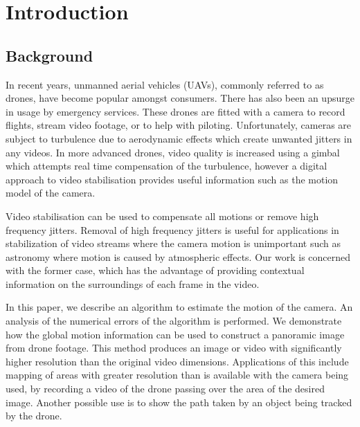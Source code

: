 \section{Introduction}
\subsection{Background}
In recent years, unmanned aerial vehicles (UAVs),
commonly referred to as drones,
have become popular amongst consumers.
There has also been an upsurge in usage by emergency services.
These drones are fitted with a camera to record flights, stream video footage, or to help  with piloting.
Unfortunately, cameras are subject to turbulence due to aerodynamic effects which create unwanted jitters in any videos. 
In more advanced drones, video quality is increased using a gimbal which attempts real time compensation of the turbulence,
however a digital approach to video stabilisation provides useful information such as the motion model of the camera.

Video stabilisation can be used to compensate all motions or remove high frequency jitters.
Removal of high frequency jitters is useful for applications in stabilization of video streams
where the camera motion is unimportant such as astronomy where motion is caused by atmospheric effects. 
Our work is concerned with the former case, which has the advantage of providing contextual information on the surroundings of each frame in the video.  


In this paper, we describe an algorithm to estimate the motion of the camera.
An analysis of the numerical errors of the algorithm is performed.
We demonstrate how the global motion information can be used to construct a panoramic image from drone footage.
This method produces an image or video with significantly higher resolution than the original video dimensions. 
Applications of this include mapping of areas with greater resolution than is available with the camera being used, by recording a video of the drone passing over the area of the desired image.
Another possible use is to show the path taken by an object being tracked by the drone.

